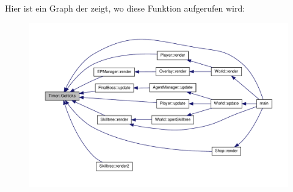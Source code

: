 Hier ist ein Graph der zeigt, wo diese Funktion aufgerufen wird\-:\nopagebreak
\begin{figure}[H]
\begin{center}
\leavevmode
\includegraphics[width=350pt]{class_timer_a419af9cdb3d77331954a78a9c877de11_icgraph}
\end{center}
\end{figure}


